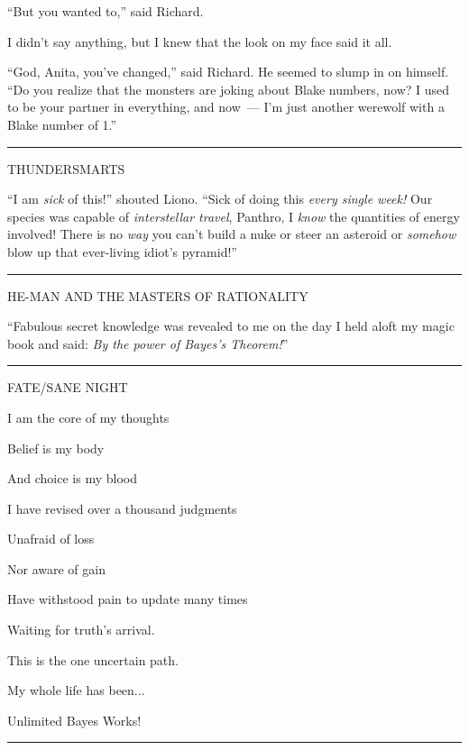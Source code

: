 ``But you wanted to,'' said Richard.

I didn't say anything, but I knew that the look on my face said it all.

``God, Anita, you've changed,'' said Richard. He seemed to slump in on himself. ``Do you realize that the monsters are joking about Blake numbers, now? I used to be your partner in everything, and now~--- I'm just another werewolf with a Blake number of 1.''

\begin{center}\rule{3in}{0.4pt}\end{center}

THUNDERSMARTS

``I am \emph{sick} of this!'' shouted Liono. ``Sick of doing this \emph{every single week!} Our species was capable of \emph{interstellar travel}, Panthro, I \emph{know} the quantities of energy involved! There is no \emph{way} you can't build a nuke or steer an asteroid or \emph{somehow} blow up that ever-living idiot's pyramid!''

\begin{center}\rule{3in}{0.4pt}\end{center}

HE-MAN AND THE MASTERS OF RATIONALITY

``Fabulous secret knowledge was revealed to me on the day I held aloft my magic book and said: \emph{By the power of Bayes's Theorem!}''

\begin{center}\rule{3in}{0.4pt}\end{center}

FATE/SANE NIGHT

I am the core of my thoughts

Belief is my body

And choice is my blood

I have revised over a thousand judgments

Unafraid of loss

Nor aware of gain

Have withstood pain to update many times

Waiting for truth's arrival.

This is the one uncertain path.

My whole life has been...

Unlimited Bayes Works!

\begin{center}\rule{3in}{0.4pt}\end{center}

